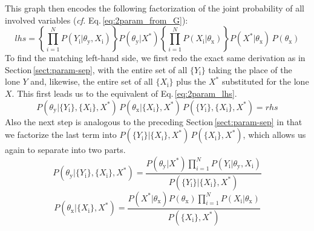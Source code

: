\documentclass[]{report}
\begin{document}
This graph then encodes the following factorization of the joint probability of all involved variables (\textit{cf.} Eq.\,\ref{eq:2param_from_G}):
\begin{equation}
lhs 
= 
\left\{
	\prod_{i=1}^{N}
		P( Y_\mathrm{i} | \theta_\mathrm{y}, X_\mathrm{i} )
\right\}
P( \theta_\mathrm{y} | X^* )
\left\{
	\prod_{i=1}^{N}
		P( X_\mathrm{i} | \theta_\mathrm{x} )
\right\}
P( X^* | \theta_\mathrm{x} ) \,
P( \theta_\mathrm{x} )
\end{equation}
To find the matching left-hand side, we first redo the exact same derivation as in Section\,\ref{sect:param-sep}, with the entire set of all $\{Y_\mathrm{i}\}$ taking the place of the lone $Y$ and, likewise, the entire set of all $\{X_\mathrm{i}\}$ plus the $X^*$ substituted for the lone $X$. This first leads us to the equivalent of Eq.\,\ref{eq:2param_lhs}.
\begin{equation}
P( \theta_\mathrm{y} | \{Y_\mathrm{i}\}, \{X_\mathrm{i}\}, X^* ) \,
P( \theta_\mathrm{x} | \{X_\mathrm{i}\}, X^* ) \,
P( \{Y_\mathrm{i}\}, \{X_\mathrm{i}\}, X^* )
= 
rhs
\end{equation}
Also the next step is analogous to the preceding Section\,\ref{sect:param-sep} in that we factorize the last term into $P( \{ Y_\mathrm{i} \} | \{ X_\mathrm{i} \}, X^* ) \, P( \{ X_\mathrm{i} \}, X^* ) $, which allows us again to separate into two parts.
\begin{equation} \label{eq:2params_obs_Y}
P( \theta_\mathrm{y} | \{Y_\mathrm{i}\}, \{X_\mathrm{i}\}, X^* ) 
=
\frac
	{
		P( \theta_\mathrm{y} | X^* )
		\prod_{i=1}^{N}
			P( Y_\mathrm{i} | \theta_\mathrm{y}, X_\mathrm{i} )
	}
	{
		P( \{Y_\mathrm{i}\} | \{X_\mathrm{i}\}, X^* )
	} 
\end{equation}
\begin{equation} \label{eq:2params_obs_X}
P( \theta_\mathrm{x} | \{X_\mathrm{i}\}, X^* ) 
=
\frac
	{
		P( X^* | \theta_\mathrm{x} )
		P( \theta_\mathrm{x} )
		\prod_{i=1}^{N}
			P( X_\mathrm{i} | \theta_\mathrm{x} )
	}
	{
		P( \{X_\mathrm{i}\}, X^* )
	} 
\end{equation}
\end{document}
